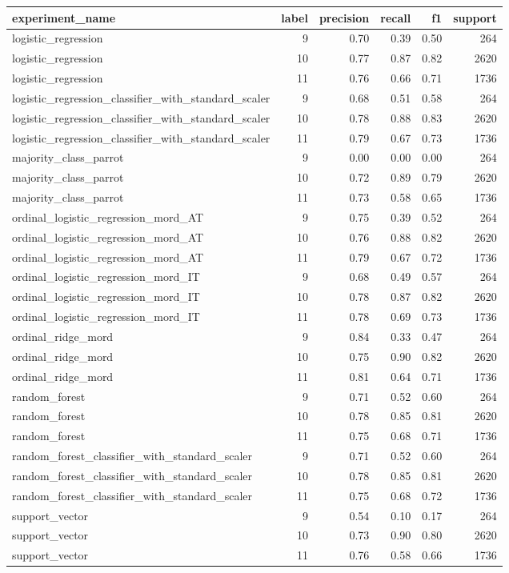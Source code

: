 \begin{tabular}{lrrrrr}
\toprule
experiment_name & label & precision & recall & f1 & support \\
\midrule
logistic_regression & 9 & 0.70 & 0.39 & 0.50 & 264 \\
logistic_regression & 10 & 0.77 & 0.87 & 0.82 & 2620 \\
logistic_regression & 11 & 0.76 & 0.66 & 0.71 & 1736 \\
logistic_regression_classifier_with_standard_scaler & 9 & 0.68 & 0.51 & 0.58 & 264 \\
logistic_regression_classifier_with_standard_scaler & 10 & 0.78 & 0.88 & 0.83 & 2620 \\
logistic_regression_classifier_with_standard_scaler & 11 & 0.79 & 0.67 & 0.73 & 1736 \\
majority_class_parrot & 9 & 0.00 & 0.00 & 0.00 & 264 \\
majority_class_parrot & 10 & 0.72 & 0.89 & 0.79 & 2620 \\
majority_class_parrot & 11 & 0.73 & 0.58 & 0.65 & 1736 \\
ordinal_logistic_regression_mord_AT & 9 & 0.75 & 0.39 & 0.52 & 264 \\
ordinal_logistic_regression_mord_AT & 10 & 0.76 & 0.88 & 0.82 & 2620 \\
ordinal_logistic_regression_mord_AT & 11 & 0.79 & 0.67 & 0.72 & 1736 \\
ordinal_logistic_regression_mord_IT & 9 & 0.68 & 0.49 & 0.57 & 264 \\
ordinal_logistic_regression_mord_IT & 10 & 0.78 & 0.87 & 0.82 & 2620 \\
ordinal_logistic_regression_mord_IT & 11 & 0.78 & 0.69 & 0.73 & 1736 \\
ordinal_ridge_mord & 9 & 0.84 & 0.33 & 0.47 & 264 \\
ordinal_ridge_mord & 10 & 0.75 & 0.90 & 0.82 & 2620 \\
ordinal_ridge_mord & 11 & 0.81 & 0.64 & 0.71 & 1736 \\
random_forest & 9 & 0.71 & 0.52 & 0.60 & 264 \\
random_forest & 10 & 0.78 & 0.85 & 0.81 & 2620 \\
random_forest & 11 & 0.75 & 0.68 & 0.71 & 1736 \\
random_forest_classifier_with_standard_scaler & 9 & 0.71 & 0.52 & 0.60 & 264 \\
random_forest_classifier_with_standard_scaler & 10 & 0.78 & 0.85 & 0.81 & 2620 \\
random_forest_classifier_with_standard_scaler & 11 & 0.75 & 0.68 & 0.72 & 1736 \\
support_vector & 9 & 0.54 & 0.10 & 0.17 & 264 \\
support_vector & 10 & 0.73 & 0.90 & 0.80 & 2620 \\
support_vector & 11 & 0.76 & 0.58 & 0.66 & 1736 \\
\bottomrule
\end{tabular}
